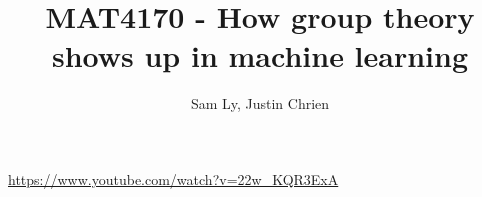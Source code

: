 \documentclass{article}
\title{MAT4170 - How group theory shows up in machine learning}
\author{Sam Ly, Justin Chrien}
\begin{document}
\maketitle
\url{https://www.youtube.com/watch?v=22w_KQR3ExA}
\end{document}

